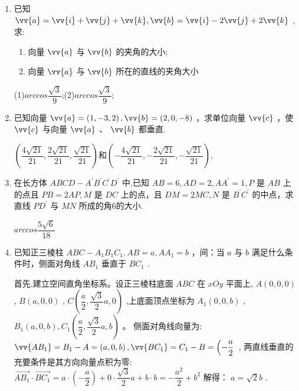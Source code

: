 \begin{enumerate}
    \begin{jieda}
        以$\vv{AB}$为x轴正方向，以$\vv{AD}$为y轴正方向，以$\vv{AP}$为z轴正方向建立空间直角坐标系。$\vv{MN}=(0,\dfrac{1}{2},\dfrac{1}{2})$
    \end{jieda}


    \item 已知 $\vv{a} = \vv{i} + \vv{j} + \vv{k},\vv{b} = \vv{i} - 2\vv{j} + 2\vv{k}$ ,求:
    \begin{enumerate}
        \item 向量 $\vv{a}$ 与 $\vv{b}$ 的夹角的大小;
        \item 向量 $\vv{a}$ 与 $\vv{b}$ 所在的直线的夹角大小
    \end{enumerate}
    \begin{jieda}
        (1)$arccos\dfrac{\sqrt{3}}{9}$;(2)$arccos\dfrac{\sqrt{3}}{9}$;
    \end{jieda}
    
    \item 已知向量 $\vv{a} = \left( {1, - 3,2}\right) ,\vv{b} = \left( {2,0, - 8}\right)$ ，求单位向量 $\vv{c}$ ，使 $\vv{c}$ 与向量 $\vv{a}$ 、 $\vv{b}$ 都垂直.
    \begin{jieda}
        $(\dfrac{4\sqrt{21}}{21},\dfrac{2\sqrt{21}}{21},\dfrac{\sqrt{21}}{21})$和$(-\dfrac{4\sqrt{21}}{21},-\dfrac{2\sqrt{21}}{21},-\dfrac{\sqrt{21}}{21})$,
    \end{jieda}


    \item 在长方体 ${ABCD} - {A}^{\prime }{B}^{\prime }{C}^{\prime }{D}^{\prime }$ 中,已知 ${AB} = 6,{AD} = 2,A{A}^{\prime } = 1,P$ 是 ${AB}$ 上的点且 ${PB} = {2AP},M$ 是 ${DC}$ 上的点，且 ${DM} = {2MC},N$ 是 ${B}^{\prime }{C}^{\prime }$ 的中点，求直线 $P{D}^{\prime }$ 与 ${MN}$ 所成的角6的大小.
    \begin{jieda}
        $arccos\dfrac{5\sqrt{6}}{18}$
    \end{jieda}

    
    \item 已知正三棱柱 ${ABC} - {A}_{1}{B}_{1}{C}_{1},{AB} = a,{A{A}_{1}} = b$ ，间：当 $a$ 与 $b$ 满足什么条件时，侧面对角线 $A{B}_{1}$ 垂直于 $B{C}_{1}$ .
    \begin{jieda}
        首先,建立空间直角坐标系。设正三棱柱底面 $ {ABC} $
在 $ {xOy} $ 平面上, $ A\left( {0,0,0}\right) $ , $ B\left( {a,0,0}\right) $ ,
$ C\left( {\dfrac{a}{2},\dfrac{\sqrt{3}}{2}a,0}\right) $ ,上底面顶点坐标为 $ {A}_{1}\left( {0,0,b}\right) $ ,
$ {B}_{1}\left( {a,0,b}\right) ,{C}_{1}\left( {\dfrac{a}{2},\dfrac{\sqrt{3}}{2}a,b}\right) $ 。
侧面对角线向量为:
$ \vv{A{B}_{1}} = {B}_{1} - A = \left( {a,0,b}\right) ,\vv{B{C}_{1}} = {C}_{1} - B = \left( {-\dfrac{a}{2}}\right. $ ,
两直线垂直的充要条件是其方向向量点积为零:
$ \overset{\rightarrow }{A{B}_{1}} \cdot  \overset{\rightarrow }{B{C}_{1}} = a \cdot  \left( { - \dfrac{a}{2}}\right)  + 0 \cdot  \dfrac{\sqrt{3}}{2}a + b \cdot  b =  - \dfrac{{a}^{2}}{2} + {b}^{2} $
解得：
$a = \sqrt{2}b $ .
    \end{jieda}


\end{enumerate}
